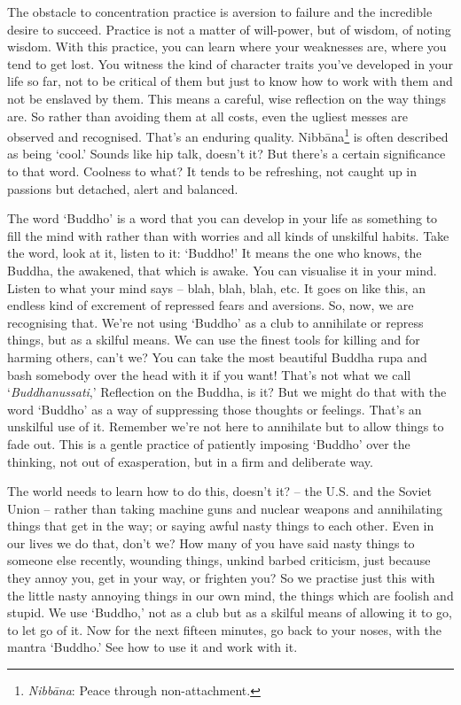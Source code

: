 The obstacle to concentration practice is aversion to failure and the incredible desire to succeed. Practice is not a matter of will-power, but of wisdom, of noting wisdom. With this practice, you can learn where your weaknesses are, where you tend to get lost. You witness the kind of character traits you've developed in your life so far, not to be critical of them but just to know how to work with them and not be enslaved by them. This means a careful, wise reflection on the way things are. So rather than avoiding them at all costs, even the ugliest messes are observed and recognised. That's an enduring quality. Nibb\=ana\footnote{\textit{Nibb\=ana}: Peace through non-attachment.} is often described as being `cool.' Sounds like hip talk, doesn't it? But there's a certain significance to that word. Coolness to what? It tends to be refreshing, not caught up in passions but detached, alert and balanced.

The word `Buddho' is a word that you can develop in your life as something to fill the mind with rather than with worries and all kinds of unskilful habits. Take the word, look at it, listen to it: `Buddho!' It means the one who knows, the Buddha, the awakened, that which is awake. You can visualise it in your mind. Listen to what your mind says -- blah, blah, blah, etc. It goes on like this, an endless kind of excrement of repressed fears and aversions. So, now, we are recognising that. We're not using `Buddho' as a club to annihilate or repress things, but as a skilful means. We can use the finest tools for killing and for harming others, can't we? You can take the most beautiful Buddha rupa and bash somebody over the head with it if you want! That's not what we call `\textit{Buddhanussati},' Reflection on the Buddha, is it? But we might do that with the word `Buddho' as a way of suppressing those thoughts or feelings. That's an unskilful use of it. Remember we're not here to annihilate but to allow things to fade out. This is a gentle practice of patiently imposing `Buddho' over the thinking, not out of exasperation, but in a firm and deliberate way.

The world needs to learn how to do this, doesn't it? -- the U.S. and the Soviet Union -- rather than taking machine guns and nuclear weapons and annihilating things that get in the way; or saying awful nasty things to each other. Even in our lives we do that, don't we? How many of you have said nasty things to someone else recently, wounding things, unkind barbed criticism, just because they annoy you, get in your way, or frighten you? So we practise just this with the little nasty annoying things in our own mind, the things which are foolish and stupid. We use `Buddho,' not as a club but as a skilful means of allowing it to go, to let go of it. Now for the next fifteen minutes, go back to your noses, with the mantra `Buddho.' See how to use it and work with it.

